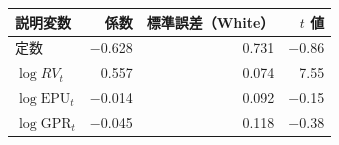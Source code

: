 \begin{tabular}{lrrr}
\toprule
説明変数 & 係数 & 標準誤差（White） & $t$ 値 \\
\midrule
定数 & \ensuremath{-}0.628 & 0.731 & \ensuremath{-}0.86 \\
$\log RV_t$ & 0.557 & 0.074 & 7.55 \\
$\log \mathrm{EPU}_t$ & \ensuremath{-}0.014 & 0.092 & \ensuremath{-}0.15 \\
$\log \mathrm{GPR}_t$ & \ensuremath{-}0.045 & 0.118 & \ensuremath{-}0.38 \\
\bottomrule
\end{tabular}
